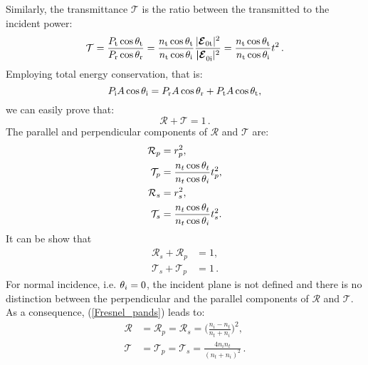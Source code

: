 Similarly, the transmittance $\mathcal{T}$ is the ratio between the transmitted to the incident power:
\begin{equation}\label{transmittance}
\mathcal{T} = \frac{P_\textrm{t} \cos\theta_\textrm{t}}{P_\textrm{r}\cos\theta_\textrm{r}} = \frac{n_\textrm{t} \cos\theta_\textrm{t}}{n_\textrm{t} \cos\theta_\textrm{i}}\frac{|\boldsymbol{\mathcal{E}}_{0 \textrm{t}}|^2}{\boldsymbol{|\mathcal{E}}_{0 \textrm{i}}|^2} = \frac{n_\textrm{t} \cos\theta_\textrm{t}}{n_\textrm{t} \cos\theta_\textrm{i}} t^2\,.
\end{equation}
Employing total energy conservation, that is:
\begin{equation}
P_\textrm{i} A\cos\theta_\textrm{i} = P_\textrm{r} A\cos\theta_\textrm{r}+P_\textrm{t} A\cos\theta_\textrm{t},
\end{equation}
we can easily prove that:
\begin{equation}
\mathcal{R}+\mathcal{T}=1\,.
\end{equation}
 The parallel and perpendicular components of $\mathcal{R}$ and $\mathcal{T}$ are:
\begin{equation}\label{Fresnel_pands}
\begin{split}
\mathcal{R}_p& =  {r_p^2},\\
\mathcal{T}_p &=  \frac{n_t \cos\theta_t}{n_t \cos\theta_i}t_p^2,\\
\mathcal{R}_s &=  r_s^2,\\
\mathcal{T}_s &= \frac{n_t \cos\theta_t}{n_t \cos\theta_i}t_s^2.\\
\end{split}
\end{equation}
It can be show that
\begin{equation}
\begin{split}
\mathcal{R}_s+\mathcal{R}_p &= 1,\\
\mathcal{T}_s+\mathcal{T}_p &=1\,.
\end{split}
\end{equation}
For normal incidence, i.e. $\theta_i = 0$, the incident plane is not defined and there is no distinction between the perpendicular and the parallel components of $\mathcal{R}$ and $\mathcal{T}$. As a consequence, (\ref{Fresnel_pands}) leads to:
\begin{equation}\label{eq:fresnel_pands2}
\begin{split}
\mathcal{R} &= \mathcal{R}_p = \mathcal{R}_s = \Bigg(\frac{n_i-n_t}{n_t+n_i}\Bigg)^2, \\
\mathcal{T} &= \mathcal{T}_p = \mathcal{T}_s = \frac{4n_i n_t}{(n_t+n_i)^2}\,.
\end{split}
\end{equation}
